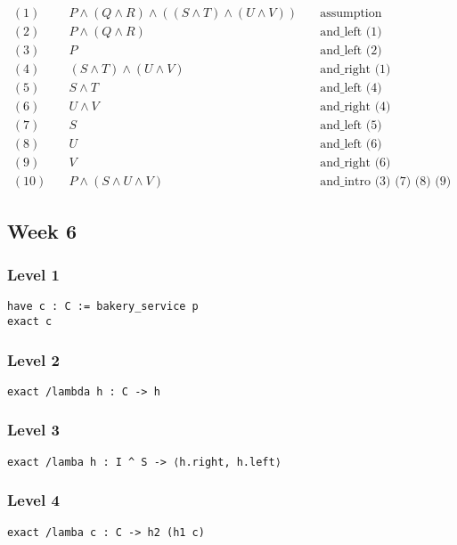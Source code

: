 \documentclass{article}
\theoremstyle{theorem}
\theoremstyle{definition}
\theoremstyle{remark}
\begin{document}
\begin{align*}
(1) &\quad P \land (Q \land R) \land ((S \land T) \land (U \land V)) \quad & \text{assumption} \\
(2) &\quad P \land (Q \land R) \quad & \text{and\_left (1)} \\
(3) &\quad P \quad & \text{and\_left (2)} \\
(4) &\quad (S \land T) \land (U \land V) \quad & \text{and\_right (1)} \\
(5) &\quad S \land T \quad & \text{and\_left (4)} \\
(6) &\quad U \land V \quad & \text{and\_right (4)} \\
(7) &\quad S \quad & \text{and\_left (5)} \\
(8) &\quad U \quad & \text{and\_left (6)} \\
(9) &\quad V \quad & \text{and\_right (6)} \\
(10) &\quad P \land (S \land U \land V) \quad & \text{and\_intro (3) (7) (8) (9)}
\end{align*}


\subsection{Week 6}


\subsubsection*{Level 1}
\begin{verbatim}
have c : C := bakery_service p
exact c
\end{verbatim}

\subsubsection*{Level 2}
\begin{verbatim}
exact /lambda h : C -> h
\end{verbatim}

\subsubsection*{Level 3}
\begin{verbatim}
exact /lamba h : I ^ S -> ⟨h.right, h.left⟩
\end{verbatim}

\subsubsection*{Level 4}
\begin{verbatim}
exact /lamba c : C -> h2 (h1 c)
\end{verbatim}
\end{document}
